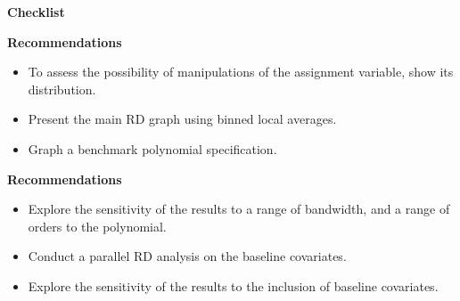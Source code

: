 \begin{frame}\begin{center}
		\LARGE\textbf{Checklist}
\end{center}\end{frame}
\begin{frame}\textbf{Recommendations}\vspace{0.3cm}

\begin{itemize}\setlength\itemsep{1em}
\item To assess the possibility of manipulations of the assignment variable, show its distribution.
\item Present the main RD graph using binned local averages.
\item Graph a benchmark polynomial specification.
\end{itemize}

\end{frame}
\begin{frame}\textbf{Recommendations}\vspace{0.3cm}

\begin{itemize}\setlength\itemsep{1em}
\item Explore the sensitivity of the results to a range of bandwidth, and a range of orders to the polynomial.
\item Conduct a parallel RD analysis on the baseline covariates.
\item Explore the sensitivity of the results to the inclusion of baseline covariates.
\end{itemize}

\end{frame}
